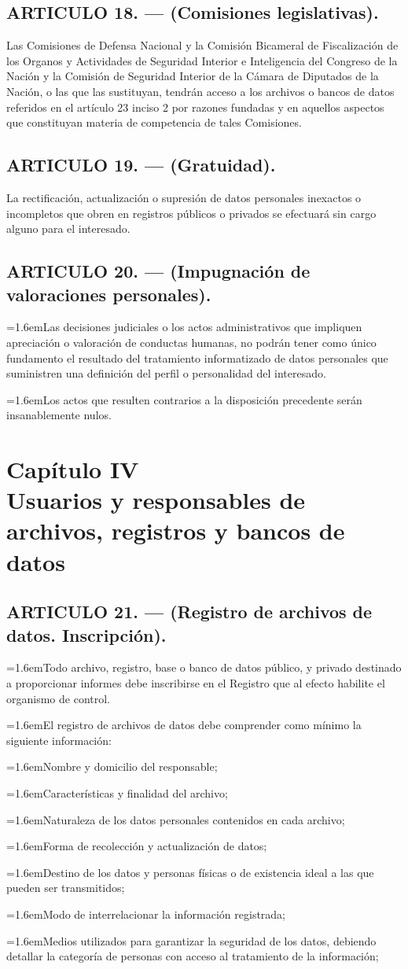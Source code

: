 \documentclass[10pt,a4paper]{article}
\newcommand{\capitulo}[2]{\section[#1 --- #2]{#1\\[2pt]#2}}
\newcommand{\articulo}[1]{\subsection{#1}}
\newcommand{\inciso}[2]{\par{\hangindent=1.6em\hangafter=1\makebox[1.6em][l]{#1}#2\par}}
\begin{document}
\articulo{ARTICULO 18. — (Comisiones legislativas).}
Las Comisiones de Defensa Nacional y la Comisión Bicameral de Fiscalización de los Organos y Actividades de Seguridad Interior e Inteligencia del Congreso de la Nación y la Comisión de Seguridad Interior de la Cámara de Diputados de la Nación, o las que las sustituyan, tendrán acceso a los archivos o bancos de datos referidos en el artículo 23 inciso 2 por razones fundadas y en aquellos aspectos que constituyan materia de competencia de tales Comisiones.

\articulo{ARTICULO 19. — (Gratuidad).}
La rectificación, actualización o supresión de datos personales inexactos o incompletos que obren en registros públicos o privados se efectuará sin cargo alguno para el interesado.

\articulo{ARTICULO 20. — (Impugnación de valoraciones personales).}
\inciso{1.}{Las decisiones judiciales o los actos administrativos que impliquen apreciación o valoración de conductas humanas, no podrán tener como único fundamento el resultado del tratamiento informatizado de datos personales que suministren una definición del perfil o personalidad del interesado.}

\inciso{2.}{Los actos que resulten contrarios a la disposición precedente serán insanablemente nulos.}

\capitulo{Capítulo IV}{Usuarios y responsables de archivos, registros y bancos de datos}
\articulo{ARTICULO 21. — (Registro de archivos de datos. Inscripción).}
\inciso{1.}{Todo archivo, registro, base o banco de datos público, y privado destinado a proporcionar informes debe inscribirse en el Registro que al efecto habilite el organismo de control.}

\inciso{2.}{El registro de archivos de datos debe comprender como mínimo la siguiente información:}

\inciso{a)}{Nombre y domicilio del responsable;}

\inciso{b)}{Características y finalidad del archivo;}

\inciso{c)}{Naturaleza de los datos personales contenidos en cada archivo;}

\inciso{d)}{Forma de recolección y actualización de datos;}

\inciso{e)}{Destino de los datos y personas físicas o de existencia ideal a las que pueden ser transmitidos;}

\inciso{f)}{Modo de interrelacionar la información registrada;}

\inciso{g)}{Medios utilizados para garantizar la seguridad de los datos, debiendo detallar la categoría de personas con acceso al tratamiento de la información;}
\end{document}
